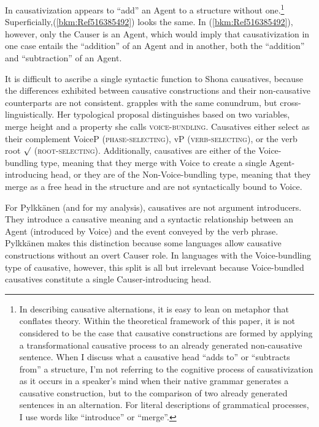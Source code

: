 \documentclass[output=paper,modfonts,nonflat]{langsci/langscibook}
\begin{document}
In  causativization appears to “add” an Agent to a structure without one.\footnote{In describing causative alternations, it is easy to lean on metaphor that conflates theory. Within the theoretical framework of this paper, it is not considered to be the case that causative constructions are formed by applying a transformational causative process to an already generated non-causative sentence. When I discuss what a causative head “adds to” or “subtracts from” a structure, I’m not referring to the cognitive process of causativization as it occurs in a speaker’s mind when their native grammar generates a causative construction, but to the comparison of two already generated sentences in an alternation. For literal descriptions of grammatical processes, I use words like “introduce” or “merge”.} Superficially,(\ref{bkm:Ref516385492}) looks the same. In (\ref{bkm:Ref516385492}), however, only the Causer is an Agent, which would imply that causativization in one case entails the “addition” of an Agent and in another, both the “addition” and “subtraction” of an Agent.



It is difficult to ascribe a single syntactic function to Shona causatives, because the differences exhibited between causative constructions and their non-causative counterparts are not consistent.  \citet{Pylkkänen2008} grapples with the same conundrum, but cross-linguistically. Her typological proposal distinguishes based on two variables, merge height and a property she calls \textsc{voice-bundling.} Causatives either select as their complement VoiceP  (\textsc{phase-selecting)}, vP \textsc{(verb-selecting)}, or the verb root ${\surd}$ (\textsc{root-selecting)}. Additionally, causatives are either of the Voice-bundling type, meaning that they merge with Voice to create a single Agent-introducing head, or they are of the Non-Voice-bundling type, meaning that they merge as a free head in the structure and are not syntactically bound to Voice. 



For Pylkkänen (and for my analysis), causatives are not argument introducers. They introduce a causative meaning and a syntactic relationship between an Agent (introduced by Voice) and the event conveyed by the verb phrase. Pylkkänen makes this distinction because some languages allow causative constructions without an overt Causer role. In languages with the Voice-bundling type of causative, however, this split is all but irrelevant because Voice-bundled causatives constitute a single Causer-introducing head. 
\end{document}
